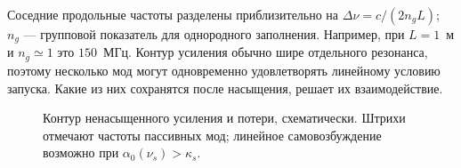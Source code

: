 Соседние продольные частоты разделены приблизительно на $\Delta\nu=c/(2n_gL)$; $n_g$ --- групповой показатель для однородного заполнения. Например, при $L=1$~м и $n_g\simeq1$ это $150$~МГц. Контур усиления обычно шире отдельного резонанса, поэтому несколько мод могут одновременно удовлетворять линейному условию запуска. Какие из них сохранятся после насыщения, решает их взаимодействие.

\begin{figure}[H]\centering

\caption{Контур ненасыщенного усиления и потери, схематически. Штрихи отмечают частоты пассивных мод; линейное самовозбуждение возможно при $\alpha_0(\nu_s)>\kappa_s$.}
\end{figure}
